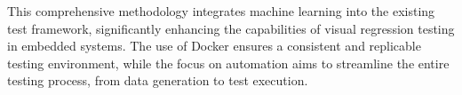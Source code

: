 \documentclass[Proposal,BIC,english,fhCitStyle,IEEE]{BASE/twbook} %
\begin{document}
This comprehensive methodology integrates machine learning into the existing test framework, significantly enhancing the capabilities of visual regression testing in embedded systems. The use of Docker ensures a consistent and replicable testing environment, while the focus on automation aims to streamline the entire testing process, from data generation to test execution.

\end{document}
